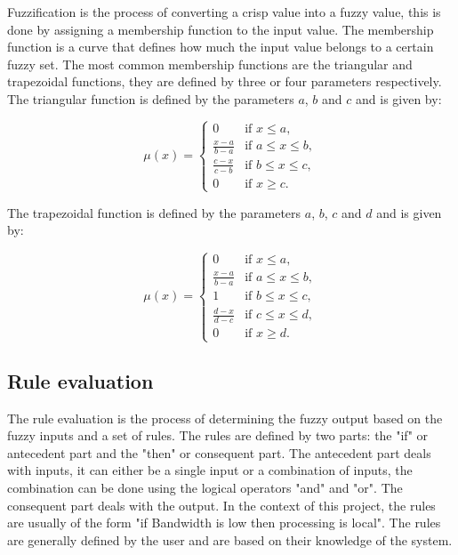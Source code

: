 Fuzzification is the process of converting a crisp value into a fuzzy value, this is done by assigning a membership
function to the input value. The membership function is a curve that defines how much the input value belongs to a
certain fuzzy set. The most common membership functions are the triangular and trapezoidal functions, they are defined
by three or four parameters respectively. The triangular function is defined by the parameters $a$, $b$ and $c$ and
is given by:

\begin{equation}
	\mu(x) = \begin{cases}
		0                   & \text{if } x \leq a,        \\
		\frac{x - a}{b - a} & \text{if } a \leq x \leq b, \\
		\frac{c - x}{c - b} & \text{if } b \leq x \leq c, \\
		0                   & \text{if } x \geq c.
	\end{cases}
\end{equation}

The trapezoidal function is defined by the parameters $a$, $b$, $c$ and $d$ and is given by:

\begin{equation}
	\mu(x) = \begin{cases}
		0                   & \text{if } x \leq a,        \\
		\frac{x - a}{b - a} & \text{if } a \leq x \leq b, \\
		1                   & \text{if } b \leq x \leq c, \\
		\frac{d - x}{d - c} & \text{if } c \leq x \leq d, \\
		0                   & \text{if } x \geq d.
	\end{cases}
\end{equation}

\subsection{Rule evaluation}
\label{subsec:fuzzy-rule-evaluation}

The rule evaluation is the process of determining the fuzzy output based on the fuzzy inputs and a set of rules. The
rules are defined by two parts: the "if" or antecedent part and the "then" or consequent part. The antecedent part
deals with inputs, it can either be a single input or a combination of inputs, the combination can be done using the
logical operators "and" and "or". The consequent part deals with the output. In the context of this project, the rules
are usually of the form "if Bandwidth is low then processing is local". The rules are generally defined by the user
and are based on their knowledge of the system.

